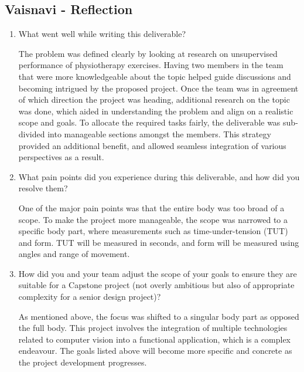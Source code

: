 \documentclass{article}
\begin{document}
\subsection*{Vaisnavi - Reflection}
\begin{enumerate}
    \item What went well while writing this deliverable? 

    The problem was defined clearly by looking at research on unsupervised performance of physiotherapy exercises. Having two members in the team that were more knowledgeable 
    about the topic helped guide discussions and becoming intrigued by the proposed project. Once the team was in agreement of which direction the project was heading, additional research on the topic was done, which aided in understanding the problem and align 
    on a realistic scope and goals. 
    To allocate the required tasks fairly, the deliverable was sub-divided into manageable sections amongst the members. This strategy provided an additional benefit, and allowed seamless integration of various perspectives as a result. 

    \item What pain points did you experience during this deliverable, and how
    did you resolve them?

    One of the major pain points was that the entire body was too broad of a scope. To make the project more manageable, the scope was narrowed to a specific body part, where measurements such as time-under-tension (TUT) and form. TUT will be measured in seconds, and form will be measured using angles and range of movement.

    \item How did you and your team adjust the scope of your goals to ensure
    they are suitable for a Capstone project (not overly ambitious but also of
    appropriate complexity for a senior design project)?
    
    As mentioned above, the focus was shifted to a singular body part as opposed the full body. This project involves the integration 
    of multiple technologies related to computer vision into a functional application, which is a complex endeavour. 
   The goals listed above will become more specific and concrete as the project development progresses. \\
  
\end{enumerate}  
\end{document}
